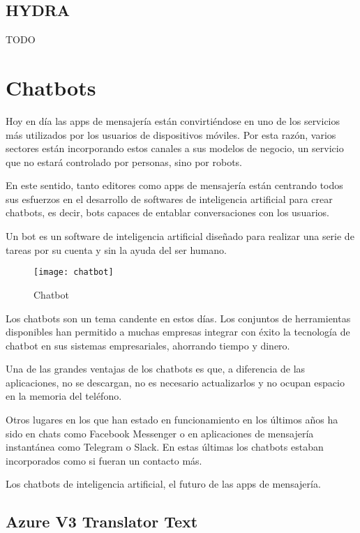 \subsection{HYDRA}

TODO

\section{Chatbots}

Hoy en día las apps de mensajería están convirtiéndose en uno de los servicios más utilizados por los usuarios de dispositivos móviles. Por esta razón, varios sectores están incorporando estos canales a sus modelos de negocio, un servicio que no estará controlado por personas, sino por robots.

En este sentido, tanto editores como apps de mensajería están centrando todos sus esfuerzos en el desarrollo de softwares de inteligencia artificial para crear chatbots, es decir, bots capaces de entablar conversaciones con los usuarios.

Un bot es un software de inteligencia artificial diseñado para realizar una serie de tareas por su cuenta y sin la ayuda del ser humano.

\begin{figure}[htp!]
  \centering
  \texttt{[image: chatbot]}
  \caption{Chatbot}
  \label{fig:chatbot}
\end{figure}

Los chatbots son un tema candente en estos días. Los conjuntos de herramientas disponibles han permitido a muchas empresas integrar con éxito la tecnología de chatbot en sus sistemas empresariales, ahorrando tiempo y dinero.

Una de las grandes ventajas de los chatbots es que, a diferencia de las aplicaciones, no se descargan, no es necesario actualizarlos y no ocupan espacio en la memoria del teléfono.

Otros lugares en los que han estado en funcionamiento en los últimos años ha sido en chats como Facebook Messenger o en aplicaciones de mensajería instantánea como Telegram o Slack. En estas últimas los chatbots estaban incorporados como si fueran un contacto más.

Los chatbots de inteligencia artificial, el futuro de las apps de mensajería.

\subsection{Azure V3 Translator Text}

